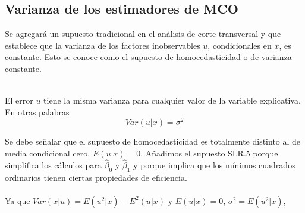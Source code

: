 \subsection{Varianza de los estimadores de MCO}
Se agregará un supuesto tradicional en el análisis de corte transversal y que establece que la varianza de los factores inobservables $u$, condicionales en $x$, es constante. Esto se conoce como el supuesto de homocedasticidad o de varianza constante.\\\\


\begin{tcolorbox}[title={Supuesto RLS.5. homocedasticidad},colback = white]
    El error $u$ tiene la misma varianza para cualquier valor de la variable explicativa. En otras palabras 
    $$Var(u|x) = \sigma^2$$
\end{tcolorbox}

Se debe señalar que el supuesto de homocedasticidad es totalmente distinto al de media condicional cero, $E(u|x) = 0$. Añadimos el supuesto SLR.5 porque simplifica los cálculos para $\hat{\beta}_0$ y $\hat{\beta}_1$ y porque implica que los mínimos cuadrados ordinarios tienen ciertas propiedades de eficiencia.\\\\ 
Ya que $Var(x|u) = E(u^2|x) - E^2(u|x)$ y $E(u|x) = 0$, $\sigma^2 = E(u^2|x)$, 



